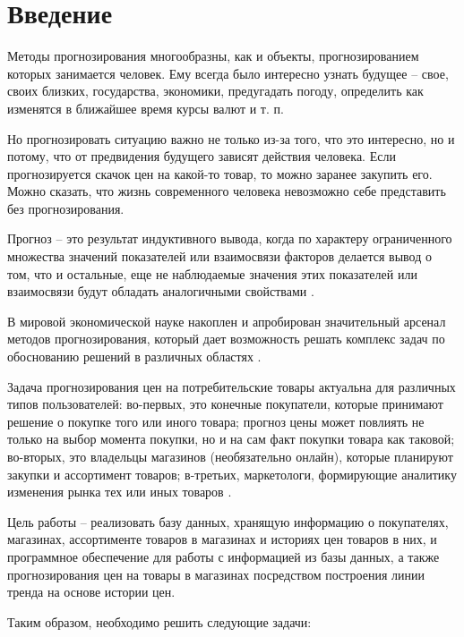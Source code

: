 \documentclass[a4paper,14pt]{extreport}
\begin{document}
	
\renewcommand{\contentsname}{Содержание}
\tableofcontents
\setcounter{page}{3}


\chapter*{Введение}

Методы прогнозирования многообразны, как и объекты, прогнозированием которых занимается человек. Ему всегда было интересно узнать будущее -- свое, своих близких, государства, экономики, предугадать погоду, определить как изменятся в ближайшее время курсы валют и т. п.

Но прогнозировать ситуацию важно не только из-за того, что это интересно, но и потому, что от предвидения будущего зависят действия человека. Если прогнозируется скачок цен на какой-то товар, то можно заранее закупить его. Можно сказать, что жизнь современного человека невозможно себе представить без прогнозирования.

Прогноз -- это результат индуктивного вывода, когда по характеру ограниченного множества значений показателей или взаимосвязи факторов делается вывод о том, что и остальные, еще не наблюдаемые значения этих показателей или взаимосвязи будут обладать аналогичными свойствами \cite{hse_pred}.

В мировой экономической науке накоплен и апробирован значительный арсенал методов прогнозирования, который дает возможность решать комплекс задач по обоснованию решений в различных областях \cite{bel_prog}.

Задача прогнозирования цен на потребительские товары актуальна для различных типов пользователей: во-первых, это конечные покупатели, которые принимают решение о покупке того или иного товара; прогноз цены может повлиять не только на выбор момента покупки, но и на сам факт покупки товара как таковой; во-вторых, это владельцы магазинов (необязательно онлайн), которые планируют закупки и ассортимент товаров; в-третьих, маркетологи, формирующие аналитику изменения рынка тех или иных товаров \cite{met_pred_online}.

Цель работы -- реализовать базу данных, хранящую информацию о покупателях, магазинах, ассортименте товаров в магазинах и историях цен товаров в них, и программное обеспечение для работы с информацией из базы данных, а также прогнозирования цен на товары в магазинах посредством построения линии тренда на основе истории цен.

Таким образом, необходимо решить следующие задачи:
\end{document}
